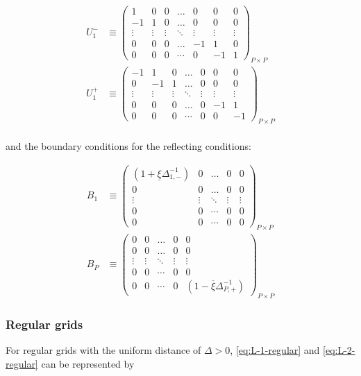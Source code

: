 \documentclass[11pt]{article}
\begin{document}
\begin{align}
U_1^{-} &\equiv \begin{pmatrix}
1  &0&0&\dots&0&0&0\\
-1&1&0&\dots&0&0&0\\
\vdots&\vdots&\vdots&\ddots&\vdots&\vdots&\vdots\\
0&0&0&\dots&-1&1&0\\
0&0&0&\cdots&0&-1&1
\end{pmatrix}_{P\times P}\label{eq:L-1-basis} \\
U_1^{+} &\equiv \begin{pmatrix}
-1  &1&0&\dots&0&0&0\\
0&-1&1&\dots&0&0&0\\
\vdots&\vdots&\vdots&\ddots&\vdots&\vdots&\vdots\\
0&0&0&\dots&0&-1&1\\
0&0&0&\cdots&0&0&-1
\end{pmatrix}_{P\times P}\label{eq:L-1+-basis} \\
\end{align}

and the boundary conditions for the reflecting conditions:

\begin{align}
B_{1}  &\equiv \begin{pmatrix}
(1 + \underline{\xi} \Delta^{-1}_{1,-}) &0&\dots&0&0\\
0&0&\dots&0&0\\
\vdots&\vdots&\ddots&\vdots&\vdots\\
0&0&\cdots&0&0\\
0&0&\cdots&0&0
\end{pmatrix}_{P\times P} \\
B_{P}  &\equiv \begin{pmatrix}
0 &0&\dots&0&0\\
0&0&\dots&0&0\\
\vdots&\vdots&\ddots&\vdots&\vdots\\
0&0&\cdots&0&0\\
0&0&\cdots&0&(1 - \overline{\xi} \Delta^{-1}_{P,+})
\end{pmatrix}_{P\times P}
\end{align}

\subsubsection{Regular grids}
For regular grids with the uniform distance of $\Delta > 0$, \eqref{eq:L-1-regular} and \eqref{eq:L-2-regular} can be represented by
\end{document}
